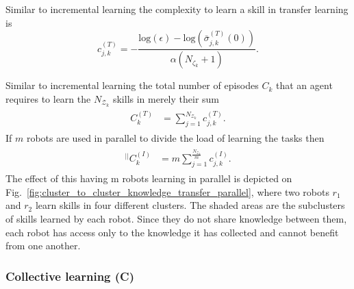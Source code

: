 Similar to incremental learning the complexity to learn a skill in transfer learning is
\begin{equation}\label{eq:skill_complexity_TL}
	c^{(T)}_{j,k} = -\frac{\text{log}(\epsilon) - \text{log}(\bar{\sigma}^{(T)}_{j,k}(0))}{\alpha (N_{\zeta_k}+ 1)}.
\end{equation}

Similar to incremental learning the total number of episodes  $ C_k $ that an agent requires to learn the $N_{\mathcal{Z}_k}$ skills in	 merely their sum
\begin{align}\label{eq:total_episodes_incremental}
	\begin{split}
		C^{(T)}_k &= \sum^{N_{\mathcal{Z}_k}}_{j=1} c^{(T)}_{j,k}.
	\end{split}
\end{align}
If $m$ robots are used in parallel to divide the load of learning the tasks then
\begin{align}
	\begin{split}
		{}^{\lvert \rvert}C^{(I)}_k &= m\sum^{\frac{N_{\mathcal{Z}_k}}{m}}_{j=1} c^{(I)}_{j,k}.
	\end{split}
\end{align}
The effect of this having m robots learning in parallel is depicted on Fig.~\ref{fig:cluster_to_cluster_knowledge_transfer_parallel}, where two robots $ r_1$ and $r_2$ learn skills in four different clusters. The shaded areas are the subclusters of skills learned by each robot. Since they do not share knowledge between them, each robot has access only to the knowledge it has collected and cannot benefit from one another. 

\subsubsection{\textbf{Collective learning (C)}}

